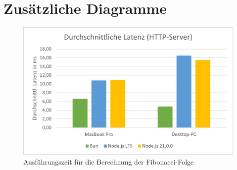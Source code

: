 \section{Zusätzliche Diagramme} \label{sec:benchmark-results-diagrams}
\begin{figure}[h!]
	\centering
	\includegraphics[width=\linewidth]{./images/httpServerAverageLatency.png}
	\caption{Ausführungszeit für die Berechnung der Fibonacci-Folge}
	\label{fig:httpServerAverageLatency}
\end{figure}


